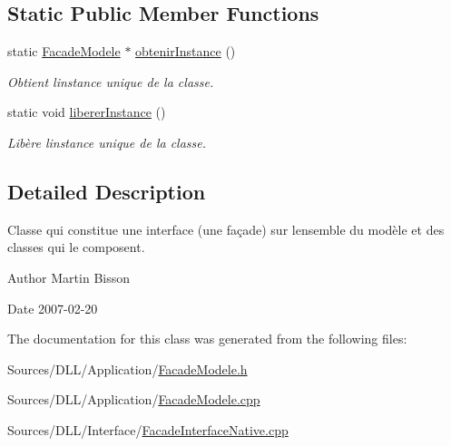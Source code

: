 \subsection*{Static Public Member Functions}
\begin{DoxyCompactItemize}
\item 
static \hyperlink{class_facade_modele}{Facade\+Modele} $\ast$ \hyperlink{group__inf2990_ga63593b81c6f3cc2251e2b61d9e8fc670}{obtenir\+Instance} ()
\begin{DoxyCompactList}\small\item\em Obtient l\textquotesingle{}instance unique de la classe. \end{DoxyCompactList}\item 
static void \hyperlink{group__inf2990_gacbf0495fda26f5be37089470dc5f4372}{liberer\+Instance} ()
\begin{DoxyCompactList}\small\item\em Libère l\textquotesingle{}instance unique de la classe. \end{DoxyCompactList}\end{DoxyCompactItemize}


\subsection{Detailed Description}
Classe qui constitue une interface (une façade) sur l\textquotesingle{}ensemble du modèle et des classes qui le composent. 

\begin{DoxyAuthor}{Author}
Martin Bisson 
\end{DoxyAuthor}
\begin{DoxyDate}{Date}
2007-\/02-\/20 
\end{DoxyDate}


The documentation for this class was generated from the following files\+:\begin{DoxyCompactItemize}
\item 
Sources/\+D\+L\+L/\+Application/\hyperlink{_facade_modele_8h}{Facade\+Modele.\+h}\item 
Sources/\+D\+L\+L/\+Application/\hyperlink{_facade_modele_8cpp}{Facade\+Modele.\+cpp}\item 
Sources/\+D\+L\+L/\+Interface/\hyperlink{_facade_interface_native_8cpp}{Facade\+Interface\+Native.\+cpp}\end{DoxyCompactItemize}
